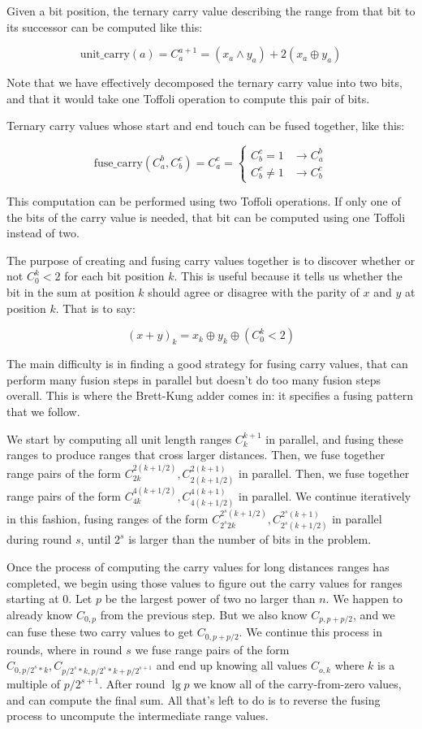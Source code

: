 \documentclass[onecolumn,unpublished]{quantumarticle}
\theoremstyle{definition}
\theoremstyle{definition}
\theoremstyle{definition}
\begin{document}
Given a bit position, the ternary carry value describing the range from that bit to its successor can be computed like this:

$$\text{unit\_carry}(a) = C_a^{a+1} = (x_a \land y_a) + 2 (x_a \oplus y_a)$$

Note that we have effectively decomposed the ternary carry value into two bits, and that it would take one Toffoli operation to compute this pair of bits.

Ternary carry values whose start and end touch can be fused together, like this:

$$\text{fuse\_carry}(C_a^b, C_b^c) = C_a^c = \begin{cases}
C_b^c = 1 & \rightarrow C_a^b \\
C_b^c \neq 1 & \rightarrow C_b^c
\end{cases}$$

This computation can be performed using two Toffoli operations.
If only one of the bits of the carry value is needed, that bit can be computed using one Toffoli instead of two.

The purpose of creating and fusing carry values together is to discover whether or not $C_0^k < 2$ for each bit position $k$.
This is useful because it tells us whether the bit in the sum at position $k$ should agree or disagree with the parity of $x$ and $y$ at position $k$.
That is to say:

$$(x + y)_k = x_k \oplus y_k \oplus (C_0^k < 2)$$

The main difficulty is in finding a good strategy for fusing carry values, that can perform many fusion steps in parallel but doesn't do too many fusion steps overall.
This is where the Brett-Kung adder comes in: it specifies a fusing pattern that we follow.

We start by computing all unit length ranges $C_k^{k+1}$ in parallel, and fusing these ranges to produce ranges that cross larger distances.
Then, we fuse together range pairs of the form $C_{2k}^{2(k+1/2)}, C_{2(k+1/2)}^{2(k+1)}$ in parallel.
Then, we fuse together range pairs of the form $C_{4k}^{4(k+1/2)}, C_{4(k+1/2)}^{4(k+1)}$ in parallel.
We continue iteratively in this fashion, fusing ranges of the form $C_{2^s 2k}^{2^s (k+1/2)}, C_{2^s (k+1/2) }^{2^s (k+1)}$ in parallel during round $s$, until $2^s$ is larger than the number of bits in the problem.

Once the process of computing the carry values for long distances ranges has completed, we begin using those values to figure out the carry values for ranges starting at 0.
Let $p$ be the largest power of two no larger than $n$.
We happen to already know $C_{0,p}$ from the previous step.
But we also know $C_{p,p+p/2}$, and we can fuse these two carry values to get $C_{0,p+p/2}$.
We continue this process in rounds, where in round $s$ we fuse range pairs of the form $C_{0,p/2^s*k}, C_{p/2^s*k,p/2^s*k+p/2^{s+1}}$ and end up knowing all values $C_{o,k}$ where $k$ is a multiple of $p/2^{s+1}$.
After round $\lg p$ we know all of the carry-from-zero values, and can compute the final sum.
All that's left to do is to reverse the fusing process to uncompute the intermediate range values.
\end{document}
